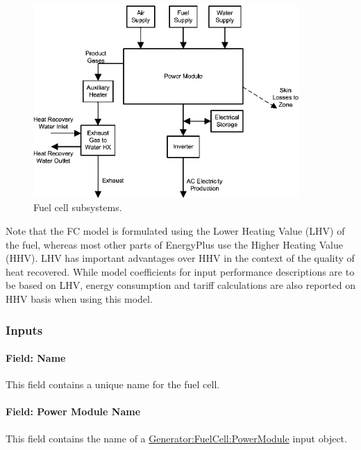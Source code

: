 \begin{figure}[hbtp] %
\centering
\includegraphics[width=0.9\textwidth, height=0.9\textheight, keepaspectratio=true]{media/image467.png}
\caption{Fuel cell subsystems. \protect \label{fig:fuel-cell-subsystems.}}
\end{figure}

Note that the FC model is formulated using the Lower Heating Value (LHV) of the fuel, whereas most other parts of EnergyPlus use the Higher Heating Value (HHV). LHV has important advantages over HHV in the context of the quality of heat recovered. While model coefficients for input performance descriptions are to be based on LHV, energy consumption and tariff calculations are also reported on HHV basis when using this model.

\subsubsection{Inputs}\label{inputs-12-003}

\paragraph{Field: Name}\label{field-name-13-002}

This field contains a unique name for the fuel cell.

\paragraph{Field: Power Module Name}\label{field-power-module-name}

This field contains the name of a \hyperref[generatorfuelcellpowermodule]{Generator:FuelCell:PowerModule} input object.

